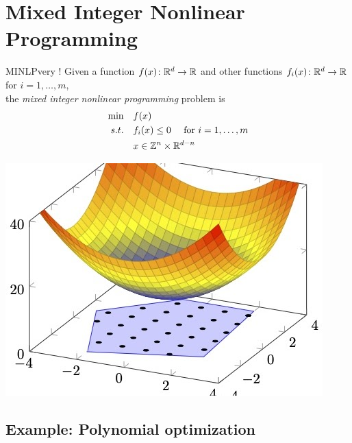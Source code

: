 \documentclass{article}
\renewcommand{\st}{s.t.}
\begin{document}
\vspace{-1cm}
\newpage
\section{Mixed Integer Nonlinear Programming}
\begin{minipage}{0.5\textwidth}
\begin{general}{MINLP}{very \nphard!}
Given a function $f(x)\colon \mathbb{R}^d \to \mathbb{R}$ and other functions $f_i(x)\colon \mathbb{R}^d \to \mathbb{R}$ for $i=1, \dots, m$,  \\
the \emph{mixed integer nonlinear programming} problem is
\begin{equation}
\label{eq:convex-programming}
\begin{split}
\min \quad & f(x)\\
\st  \quad & f_i(x) \leq 0  \quad  \text{ for } i=1, \dots, m\\
& x \in \Z^n \times \R^{d-n}
\end{split}
\end{equation}
\end{general}
\end{minipage}
\begin{minipage}{0.5\textwidth}
\begin{center}
\includegraphics[scale = 0.3]{presentation_figures/minlp}
\end{center}
\end{minipage}


\newpage
\subsection{Example: Polynomial optimization}
\end{document}
